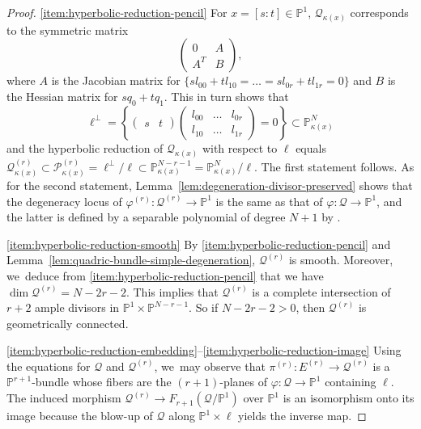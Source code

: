 \documentclass[JEP,XML,SOM,Unicode,NoEqCountersInSection,published]{cedram}
\theoremstyle{plain}
\theoremstyle{definition}
\let\phi\varphi
\renewcommand\P{\mathbb{P}}
\begin{document}
\skpt
\begin{proof}
\eqref{item:hyperbolic-reduction-pencil}
For $x =[s:t]\in \P^1$, $\mathcal{Q}_{\kappa(x)}$ corresponds to the symmetric matrix
\[
\begin{pmatrix}
0 & A\\
A^T & B
\end{pmatrix},
\]
where $A$ is the Jacobian matrix for $\{s l_{00} + t l_{10} = \dots = s l_{0r} + t l_{1r} = 0\}$ and $B$ is the Hessian matrix for $s q_0 + t q_1$.
This in turn shows that
\[
\ell^{\perp}=
\left\{
\begin{pmatrix}
s & t
\end{pmatrix}
\begin{pmatrix}
l_{00} & \dots &l_{0r}\\
l_{10} & \dots & l_{1r}
\end{pmatrix}
=0
\right\}
\subset \P^{N}_{\kappa(x)}
\]
and the hyperbolic reduction of $\mathcal{Q}_{\kappa(x)}$ with respect to $\ell$ equals $\mathcal{Q}^{(r)}_{\kappa(x)} \subset \mathcal{P}^{(r)}_{\kappa(x)}=\ell^\perp/\ell \subset \P^{N-r-1}_{\kappa(x)}=\P^{N}_{\kappa(x)}/\ell$.
The first statement follows.
As for the second statement, Lemma~\ref{lem:degeneration-divisor-preserved} shows that the degeneracy locus of $\phi^{(r)}\colon \mathcal{Q}^{(r)}\to \P^1$ is the same as that of $\phi\colon \mathcal{Q}\to \P^1$, and the latter is defined by a separable polynomial of degree $N+1$ by \cite[Prop.\,2.1]{Reid-thesis}.

\eqref{item:hyperbolic-reduction-smooth}
By \eqref{item:hyperbolic-reduction-pencil} and Lemma~\ref{lem:quadric-bundle-simple-degeneration},
$\mathcal{Q}^{(r)}$ is smooth.
Moreover, we~deduce from \eqref{item:hyperbolic-reduction-pencil} that we have $\dim \mathcal{Q}^{(r)}=N-2r-2$.
This implies that $\mathcal{Q}^{(r)}$ is a complete intersection of $r+2$ ample divisors in $\P^1\times \P^{N-r-1}$.
So if $N-2r-2>0$, then $\mathcal{Q}^{(r)}$ is geometrically connected.

\eqref{item:hyperbolic-reduction-embedding}--\eqref{item:hyperbolic-reduction-image}
Using the equations for $\mathcal{Q}$ and $\mathcal{Q}^{(r)}$, we~may observe that
$\pi^{(r)}\colon E^{(r)}\to \mathcal{Q}^{(r)}$ is a $\P^{r+1}$-bundle
whose fibers are
the $(r+1)$-planes of $\phi\colon \mathcal{Q}\to \P^1$
containing $\ell$.
The induced morphism $\mathcal{Q}^{(r)}\to F_{r+1}(\mathcal{Q}/\P^1)$ over $\P^1$ is an isomorphism onto its image
because the blow-up of $\mathcal{Q}$ along $\P^1\times \ell$
yields the inverse map.


\end{proof}
\end{document}
